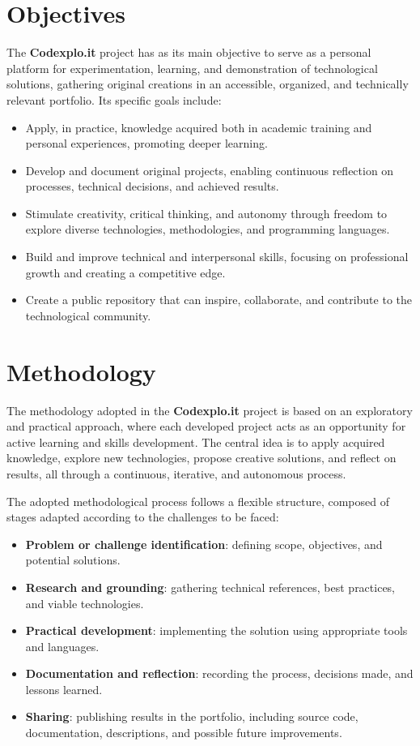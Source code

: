 \documentclass[10pt, a4paper, oneside]{article}
\begin{document}
\section{Objectives}

The \textbf{Codexplo.it} project has as its main objective to serve as a personal platform for experimentation, learning, and demonstration of technological solutions, gathering original creations in an accessible, organized, and technically relevant portfolio. Its specific goals include:

\begin{itemize}
  \item Apply, in practice, knowledge acquired both in academic training and personal experiences, promoting deeper learning.
  \item Develop and document original projects, enabling continuous reflection on processes, technical decisions, and achieved results.
  \item Stimulate creativity, critical thinking, and autonomy through freedom to explore diverse technologies, methodologies, and programming languages.
  \item Build and improve technical and interpersonal skills, focusing on professional growth and creating a competitive edge.
  \item Create a public repository that can inspire, collaborate, and contribute to the technological community.\newpage
\end{itemize}

\section{Methodology}

The methodology adopted in the \textbf{Codexplo.it} project is based on an exploratory and practical approach, where each developed project acts as an opportunity for active learning and skills development. The central idea is to apply acquired knowledge, explore new technologies, propose creative solutions, and reflect on results, all through a continuous, iterative, and autonomous process.

The adopted methodological process follows a flexible structure, composed of stages adapted according to the challenges to be faced:

\begin{itemize}
  \item \textbf{Problem or challenge identification}: defining scope, objectives, and potential solutions.
  \item \textbf{Research and grounding}: gathering technical references, best practices, and viable technologies.
  \item \textbf{Practical development}: implementing the solution using appropriate tools and languages.
  \item \textbf{Documentation and reflection}: recording the process, decisions made, and lessons learned.
  \item \textbf{Sharing}: publishing results in the portfolio, including source code, documentation, descriptions, and possible future improvements.
\end{itemize}
\end{document}
